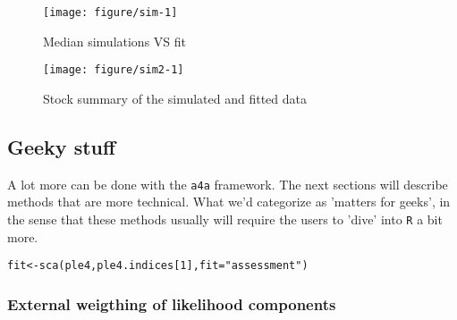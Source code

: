 \documentclass[a4paper,english,10pt]{article}\usepackage[]{graphicx}\usepackage[]{color}
\makeatletter
\def\maxwidth{ %
  \ifdim\Gin@nat@width>\linewidth
    \linewidth
  \else
    \Gin@nat@width
  \fi
}
\newcommand{\hlnum}[1]{\textcolor[rgb]{0.2,0.2,0.2}{#1}}%
\newcommand{\hlstr}[1]{\textcolor[rgb]{0.2,0.2,0.2}{#1}}%
\newcommand{\hlstd}[1]{\textcolor[rgb]{0,0,0}{#1}}%
\newcommand{\hlkwb}[1]{\textcolor[rgb]{0.361,0.506,0.596}{#1}}%
\newcommand{\hlkwc}[1]{\textcolor[rgb]{0.361,0.506,0.596}{#1}}%
\newcommand{\hlkwd}[1]{\textcolor[rgb]{0.361,0.506,0.596}{#1}}%
\newenvironment{kframe}{%
 \def\at@end@of@kframe{}%
 \ifinner\ifhmode%
  \def\at@end@of@kframe{\end{minipage}}%
  \begin{minipage}{\columnwidth}%
 \fi\fi%
 \def\FrameCommand##1{\hskip\@totalleftmargin \hskip-\fboxsep
 \colorbox{shadecolor}{##1}\hskip-\fboxsep
     \hskip-\linewidth \hskip-\@totalleftmargin \hskip\columnwidth}%
 \MakeFramed {\advance\hsize-\width
   \@totalleftmargin\z@ \linewidth\hsize
   \@setminipage}}%
 {\par\unskip\endMakeFramed%
 \at@end@of@kframe}
\newenvironment{knitrout}{}{} %
\newcommand{\initiative}[1]{{\texttt{#1}}}
\newcommand{\pkg}[1]{{\texttt{#1}}}
\makeatother
\begin{document}
\begin{knitrout}
\color{fgcolor}\begin{figure}[H]

{\centering \texttt{[image: figure/sim-1]} 

}

\caption[Median simulations VS fit]{Median simulations VS fit\label{fig:sim}}
\end{figure}


\end{knitrout}

\begin{knitrout}
\color{fgcolor}\begin{figure}[H]

{\centering \texttt{[image: figure/sim2-1]} 

}

\caption[Stock summary of the simulated and fitted data]{Stock summary of the simulated and fitted data\label{fig:sim2}}
\end{figure}


\end{knitrout}

\subsection{Geeky stuff}

A lot more can be done with the \initiative{a4a} framework. The next sections will describe methods that are more technical. What we'd categorize as 'matters for geeks', in the sense that these methods usually will require the users to 'dive' into \pkg{R} a bit more. 

\begin{knitrout}
\color{fgcolor}\begin{kframe}
\begin{alltt}
\hlstd{fit} \hlkwb{<-} \hlkwd{sca}\hlstd{(ple4, ple4.indices[}\hlnum{1}\hlstd{],} \hlkwc{fit}\hlstd{=}\hlstr{"assessment"}\hlstd{)}
\end{alltt}
\end{kframe}
\end{knitrout}

\subsubsection{External weigthing of likelihood components}
\end{document}
